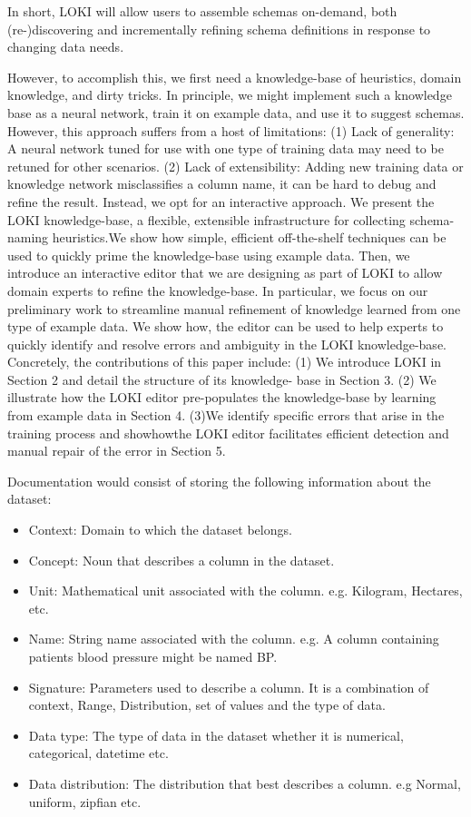 \documentclass{vldb}
\begin{document}
In short, LOKI will allow users to assemble schemas on-demand, both (re-)discovering and incrementally refining schema definitions in response to changing data needs. 

However, to accomplish this, we first need a knowledge-base of heuristics, domain knowledge, and dirty tricks. In principle, we might implement such a knowledge base as a neural network, train it on example data, and use it to suggest schemas. However, this approach suffers from a host of limitations:
(1) Lack of generality: A neural network tuned for use with one
type of training data may need to be retuned for other scenarios.
(2) Lack of extensibility: Adding new training data or knowledge network misclassifies a column name, it can be hard to debug and
refine the result. Instead, we opt for an interactive approach. We
present the LOKI knowledge-base, a flexible, extensible infrastructure
for collecting schema-naming heuristics.We show how simple,
efficient off-the-shelf techniques can be used to quickly prime the
knowledge-base using example data. Then, we introduce an interactive
editor that we are designing as part of LOKI to allow domain
experts to refine the knowledge-base. In particular, we focus on our
preliminary work to streamline manual refinement of knowledge
learned from one type of example data. We show how, the editor
can be used to help experts to quickly identify and resolve errors
and ambiguity in the LOKI knowledge-base.
Concretely, the contributions of this paper include: (1) We introduce
LOKI in Section 2 and detail the structure of its knowledge-
base in Section 3. (2) We illustrate how the LOKI editor
pre-populates the knowledge-base by learning from example data
in Section 4. (3)We identify specific errors that arise in the training
process and showhowthe LOKI editor facilitates efficient detection
and manual repair of the error in Section 5.

Documentation would consist of storing the following information about the dataset:
\begin{itemize}
	\item Context: Domain to which the dataset belongs.
	\item Concept: Noun that describes a column in the dataset.
	\item Unit: Mathematical unit associated with the column. e.g. Kilogram, Hectares, etc.
	\item Name: String name associated with the column. e.g. A column containing patients blood pressure might be named BP.
	\item Signature: Parameters used to describe a column. It is a combination of context, Range, Distribution, set of values and the type of data.
	\item Data type: The type of data in the dataset whether it is numerical, categorical, datetime etc.
	\item Data distribution: The distribution that best describes a column. e.g Normal, uniform, zipfian etc.
\end{itemize}
\end{document}
